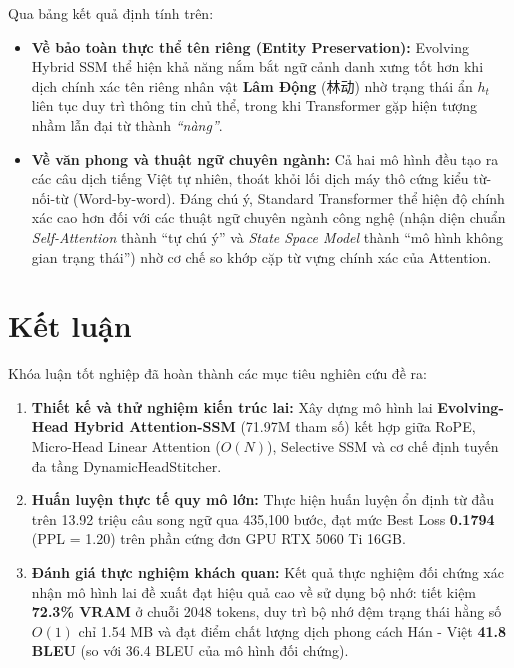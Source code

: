 \documentclass{uetgraduation}
\begin{document}
Qua bảng kết quả định tính trên:
\begin{itemize}
    \item \textbf{Về bảo toàn thực thể tên riêng (Entity Preservation):} Evolving Hybrid SSM thể hiện khả năng nắm bắt ngữ cảnh danh xưng tốt hơn khi dịch chính xác tên riêng nhân vật \textbf{Lâm Động} ({\cjkfont 林动}) nhờ trạng thái ẩn $h_t$ liên tục duy trì thông tin chủ thể, trong khi Transformer gặp hiện tượng nhầm lẫn đại từ thành \textit{``nàng''}.
    \item \textbf{Về văn phong và thuật ngữ chuyên ngành:} Cả hai mô hình đều tạo ra các câu dịch tiếng Việt tự nhiên, thoát khỏi lối dịch máy thô cứng kiểu từ-nối-từ (Word-by-word). Đáng chú ý, Standard Transformer thể hiện độ chính xác cao hơn đối với các thuật ngữ chuyên ngành công nghệ (nhận diện chuẩn \textit{Self-Attention} thành ``tự chú ý'' và \textit{State Space Model} thành ``mô hình không gian trạng thái'') nhờ cơ chế so khớp cặp từ vựng chính xác của Attention.
\end{itemize}

\section{Kết luận}
Khóa luận tốt nghiệp đã hoàn thành các mục tiêu nghiên cứu đề ra:
\begin{enumerate}
    \item \textbf{Thiết kế và thử nghiệm kiến trúc lai:} Xây dựng mô hình lai \textbf{Evolving-Head Hybrid Attention-SSM} (71.97M tham số) kết hợp giữa RoPE, Micro-Head Linear Attention ($O(N)$), Selective SSM và cơ chế định tuyến đa tầng DynamicHeadStitcher.
    \item \textbf{Huấn luyện thực tế quy mô lớn:} Thực hiện huấn luyện ổn định từ đầu trên 13.92 triệu câu song ngữ qua 435,100 bước, đạt mức Best Loss \textbf{0.1794} (PPL = 1.20) trên phần cứng đơn GPU RTX 5060 Ti 16GB.
    \item \textbf{Đánh giá thực nghiệm khách quan:} Kết quả thực nghiệm đối chứng xác nhận mô hình lai đề xuất đạt hiệu quả cao về sử dụng bộ nhớ: tiết kiệm \textbf{72.3\% VRAM} ở chuỗi 2048 tokens, duy trì bộ nhớ đệm trạng thái hằng số $O(1)$ chỉ 1.54 MB và đạt điểm chất lượng dịch phong cách Hán - Việt \textbf{41.8 BLEU} (so với 36.4 BLEU của mô hình đối chứng).
\end{enumerate}
\end{document}
